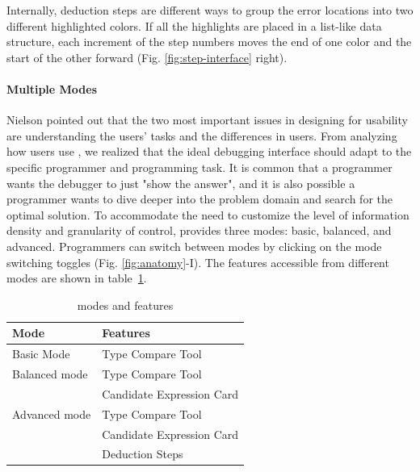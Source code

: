 Internally, deduction steps are different ways to group the error locations into two different highlighted colors. If all the highlights are placed in a list-like data structure, each increment of the step numbers moves the end of one color and the start of the other forward (Fig. \ref{fig:step-interface} right).


\paragraph{Multiple Modes}

Nielson pointed out \cite{nielsen1994usability}  that the two most important issues in designing for usability are understanding the users' tasks and the differences in users. From analyzing how users use \chameleon{}, we realized that the ideal debugging interface should adapt to the specific programmer and programming task. It is common that a programmer wants the debugger to just "show the answer", and it is also possible a programmer wants to dive deeper into the problem domain and search for the optimal solution. To accommodate the need to customize the level of information density and granularity of control, \chameleon{} provides three modes: basic, balanced, and advanced. Programmers can switch between modes by clicking on the mode switching toggles (Fig. \ref{fig:anatomy}-I). The features accessible from different modes are shown in table~\ref{tab:chameleon-features}.

\begin{table}
    \centering
    \begin{tabular}{ l l  }
     Mode & Features \\ \hline
     Basic Mode & Type Compare Tool \\ \hline
     Balanced mode & Type Compare Tool \\
     & Candidate Expression Card \\  \hline
     Advanced mode & Type Compare Tool \\
     & Candidate Expression Card \\
     & Deduction Steps \\
    \end{tabular}
    \caption{\chameleon{} modes and features}
    \label {tab:chameleon-features}
\end{table}


